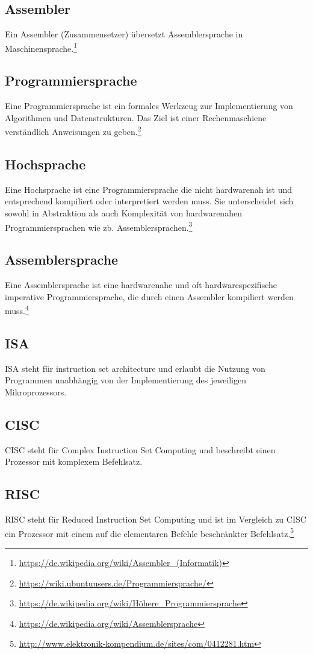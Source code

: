 \documentclass[
	11pt,								%
	parskip=half-,						%
	paper=a4,							%
	english,ngerman,					%
	]{scrartcl}							%
\begin{document}
\subsection*{Assembler}
Ein Assembler (Zusammensetzer) übersetzt Assemblersprache in Maschinensprache.\footnote{\url{https://de.wikipedia.org/wiki/Assembler\_(Informatik)}}

\subsection*{Programmiersprache}
Eine Programmiersprache ist ein formales Werkzeug zur Implementierung von Algorithmen und Datenstrukturen. Das Ziel ist einer Rechenmaschiene verständlich Anweisungen zu geben.\footnote{\url{https://wiki.ubuntuusers.de/Programmiersprache/}}

\subsection*{Hochsprache}
Eine Hochsprache ist eine Programmiersprache die nicht hardwarenah ist und entsprechend kompiliert oder interpretiert werden muss. Sie unterscheidet sich sowohl in Abstraktion als auch Komplexität von hardwarenahen Programmiersprachen wie zb. Assemblersprachen.\footnote{\url{https://de.wikipedia.org/wiki/Höhere\_Programmiersprache}}

\subsection*{Assemblersprache}
Eine Assemblersprache ist eine hardwarenahe und oft hardwarespezifische imperative Programmiersprache, die durch einen Assembler kompiliert werden muss.\footnote{\url{https://de.wikipedia.org/wiki/Assemblersprache}}

\subsection*{ISA}
ISA steht für instruction set architecture und erlaubt die Nutzung von Programmen unabhängig von der Implementierung des jeweiligen Mikroprozessors.

\subsection*{CISC}
CISC steht für Complex Instruction Set Computing und beschreibt einen Prozessor mit komplexem Befehlsatz.

\subsection*{RISC}
RISC steht für Reduced Instruction Set Computing und ist im Vergleich zu CISC ein Prozessor mit einem auf die elementaren Befehle beschränkter Befehlsatz.\footnote{\url{http://www.elektronik-kompendium.de/sites/com/0412281.htm}}


\end{document}
